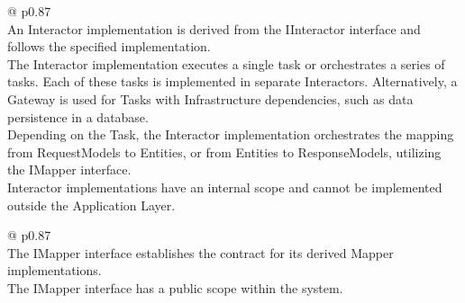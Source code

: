 \begin{table}[H]
    \begin{tabular}{@{\makebox[2em][c]{\rownumber\space}}  p{0.87\linewidth}}
        \\ 
    \hline
    An Interactor implementation is derived from the IInteractor interface and follows the
    specified implementation. \\

    The Interactor implementation executes a single task or orchestrates a series of
    tasks. Each of these tasks is implemented in separate Interactors. Alternatively, a
    Gateway is used for Tasks with Infrastructure dependencies, such as data persistence
    in a database. \\
    
    Depending on the Task, the Interactor implementation orchestrates the mapping from
    RequestModels to Entities, or from Entities to ResponseModels, utilizing the IMapper
    interface. \\
    
    Interactor implementations have an internal scope and cannot be implemented outside
    the Application Layer. \\
    \hline
    \end{tabular}
\caption{Interactor Implementation Requirements}
\label{table_requirements_interactor}
\end{table}

\begin{table}[H]
    \begin{tabular}{@{\makebox[2em][c]{\rownumber\space}}  p{0.87\linewidth}}
        \\ 
    \hline
    The IMapper interface establishes the contract for its derived Mapper implementations.
    \\

    The IMapper interface has a public scope within the system. \\
    \hline
    \end{tabular}
\caption{IMapper Requirements}
\label{table_requirements_imapper}
\end{table}

